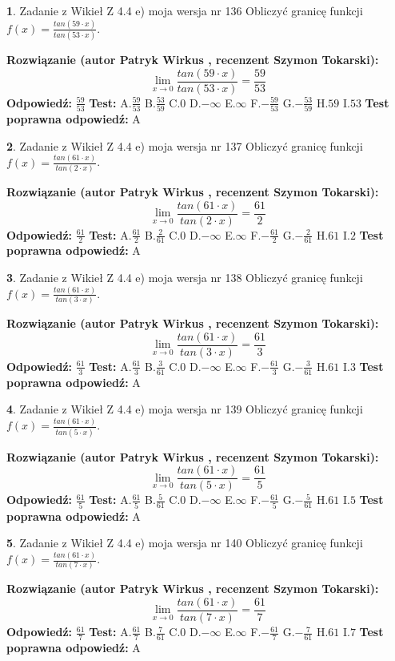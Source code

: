\documentclass[12pt, a4paper]{article}
\theoremstyle{definition} %
\newtheorem{zad}{}
\newcommand{\zadStart}[1]{\begin{zad}#1\newline}
\newcommand{\zadStop}{\end{zad}}
\newcommand{\rozwStart}[2]{\noindent \textbf{Rozwiązanie (autor #1 , recenzent #2): }\newline}
\newcommand{\rozwStop}{\newline}
\newcommand{\odpStart}{\noindent \textbf{Odpowiedź:}\newline}
\newcommand{\odpStop}{\newline}
\newcommand{\testStart}{\noindent \textbf{Test:}\newline}
\newcommand{\testStop}{\newline}
\newcommand{\kluczStart}{\noindent \textbf{Test poprawna odpowiedź:}\newline}
\newcommand{\kluczStop}{\newline}
\begin{document}
\zadStart{Zadanie z Wikieł Z 4.4 e) moja wersja nr 136}
Obliczyć granicę funkcji $f(x)=\frac{tan(59\cdot x)}{tan(53\cdot x)}$.
\zadStop
\rozwStart{Patryk Wirkus}{Szymon Tokarski}
$$\lim\limits_{x\to 0}\frac{tan(59\cdot x)}{tan(53\cdot x)}=
\frac{59}{53}$$
\rozwStop
\odpStart
$\frac{59}{53}$
\odpStop
\testStart
A.$\frac{59}{53}$
B.$\frac{53}{59}$
C.$0$
D.$-\infty$
E.$\infty$
F.$-\frac{59}{53}$
G.$-\frac{53}{59}$
H.$59$
I.$53$
\testStop
\kluczStart
A
\kluczStop



\zadStart{Zadanie z Wikieł Z 4.4 e) moja wersja nr 137}
Obliczyć granicę funkcji $f(x)=\frac{tan(61\cdot x)}{tan(2\cdot x)}$.
\zadStop
\rozwStart{Patryk Wirkus}{Szymon Tokarski}
$$\lim\limits_{x\to 0}\frac{tan(61\cdot x)}{tan(2\cdot x)}=
\frac{61}{2}$$
\rozwStop
\odpStart
$\frac{61}{2}$
\odpStop
\testStart
A.$\frac{61}{2}$
B.$\frac{2}{61}$
C.$0$
D.$-\infty$
E.$\infty$
F.$-\frac{61}{2}$
G.$-\frac{2}{61}$
H.$61$
I.$2$
\testStop
\kluczStart
A
\kluczStop



\zadStart{Zadanie z Wikieł Z 4.4 e) moja wersja nr 138}
Obliczyć granicę funkcji $f(x)=\frac{tan(61\cdot x)}{tan(3\cdot x)}$.
\zadStop
\rozwStart{Patryk Wirkus}{Szymon Tokarski}
$$\lim\limits_{x\to 0}\frac{tan(61\cdot x)}{tan(3\cdot x)}=
\frac{61}{3}$$
\rozwStop
\odpStart
$\frac{61}{3}$
\odpStop
\testStart
A.$\frac{61}{3}$
B.$\frac{3}{61}$
C.$0$
D.$-\infty$
E.$\infty$
F.$-\frac{61}{3}$
G.$-\frac{3}{61}$
H.$61$
I.$3$
\testStop
\kluczStart
A
\kluczStop



\zadStart{Zadanie z Wikieł Z 4.4 e) moja wersja nr 139}
Obliczyć granicę funkcji $f(x)=\frac{tan(61\cdot x)}{tan(5\cdot x)}$.
\zadStop
\rozwStart{Patryk Wirkus}{Szymon Tokarski}
$$\lim\limits_{x\to 0}\frac{tan(61\cdot x)}{tan(5\cdot x)}=
\frac{61}{5}$$
\rozwStop
\odpStart
$\frac{61}{5}$
\odpStop
\testStart
A.$\frac{61}{5}$
B.$\frac{5}{61}$
C.$0$
D.$-\infty$
E.$\infty$
F.$-\frac{61}{5}$
G.$-\frac{5}{61}$
H.$61$
I.$5$
\testStop
\kluczStart
A
\kluczStop



\zadStart{Zadanie z Wikieł Z 4.4 e) moja wersja nr 140}
Obliczyć granicę funkcji $f(x)=\frac{tan(61\cdot x)}{tan(7\cdot x)}$.
\zadStop
\rozwStart{Patryk Wirkus}{Szymon Tokarski}
$$\lim\limits_{x\to 0}\frac{tan(61\cdot x)}{tan(7\cdot x)}=
\frac{61}{7}$$
\rozwStop
\odpStart
$\frac{61}{7}$
\odpStop
\testStart
A.$\frac{61}{7}$
B.$\frac{7}{61}$
C.$0$
D.$-\infty$
E.$\infty$
F.$-\frac{61}{7}$
G.$-\frac{7}{61}$
H.$61$
I.$7$
\testStop
\kluczStart
A
\kluczStop
\end{document}

